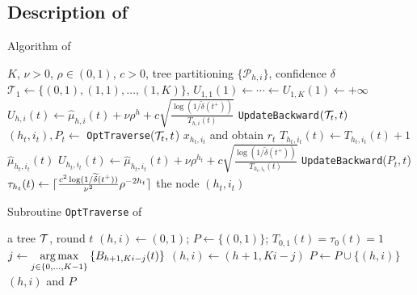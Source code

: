 \subsection{Description of \HCT{}}
\begin{algorithm}[ht]
\centering
\caption{Algorithm of \HCT{}}
\label{alg:hct}
\begin{algorithmic}[1]
     $K$, $\nu>0$, $\rho\in(0,1)$, $c>0$, tree partitioning $\{\mathcal{P}_{h,i}\}$, confidence $\delta$
     $\mathcal{T}_1 \gets \{(0,1),(1,1),\ldots,(1,K)\}$, $U_{1,1}(1) \gets \cdots \gets U_{1,K}(1) \gets +\infty$
                \State $U_{h,i}(t) \gets \hat{\mu}_{h,i}(t) + \nu\rho^{h} + c\sqrt{\frac{\operatorname{log}\left(1/\tilde{\delta}(t^+)\right)}{T_{h,i}(t)}}$
            \EndFor
            \State \texttt{UpdateBackward}$(\mathcal{T}_t, t)$
        \EndIf
        \State $(h_t,i_t),P_t \gets$ \texttt{OptTraverse}($\mathcal{T}_t, t$)
        \State {} $x_{h_t,i_t}$ and obtain $r_t$
        \State $T_{h_t,i_t}(t) \gets T_{h_t,i_t}(t)+1$
        \State {} $\hat{\mu}_{h_t,i_t}(t)$
        \State $U_{h_t,i_t}(t) \gets \hat{\mu}_{h_t,i_t}(t) + \nu\rho^{h_t} + c\sqrt{\frac{\operatorname{log}\left(1/\tilde{\delta}(t^+)\right)}{T_{h_t,i_t}(t)}}$
        \State \texttt{UpdateBackward}($P_t, t$)
        \State $\tau_{h_t}(t) \gets \lceil\frac{c^2\operatorname{log}(1/\widetilde{\delta}(t^+))}{\nu^2}\rho^{-2h_t}\rceil$
            \State {} the node $(h_t,i_t)$
        \EndIf
    \EndFor
\end{algorithmic}
\end{algorithm}

\begin{algorithm}[ht]
\centering
\caption{Subroutine \texttt{OptTraverse} of \HCT{}}
\label{alg:hct_opt}
\begin{algorithmic}[1]
     a tree $\mathcal{T}$, round $t$
     $(h,i)\leftarrow (0,1)$; $P\leftarrow \{(0,1)\}$; $T_{0,1}(t)=\tau_0(t)=1$
        \State $j \gets \underset{j\in\{0,\ldots,K-1\}}{\operatorname*{arg\,max}} \left\{B_{h+1,Ki-j}(t)\right\}$
        \State $(h,i) \gets (h+1,Ki-j)$
        \State $P\leftarrow P\cup\{(h,i)\}$
    \EndWhile
     $(h,i)$ and $P$
\end{algorithmic}
\end{algorithm}

